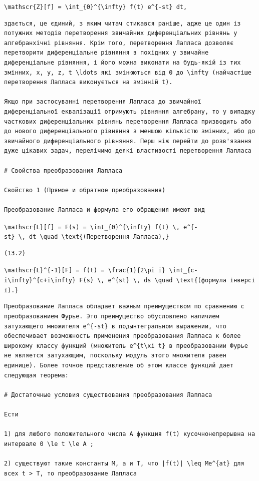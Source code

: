 \documentclass[
  ukrainian,
]{article}
\begin{document}
\texttt{\textbackslash{}mathscr\{Z\}{[}f{]}\ =\ \textbackslash{}int\_\{0\}\^{}\{\textbackslash{}infty\}\ f(t)\ e\^{}\{-st\}\ dt,}

\begin{verbatim}
здається, це єдиний, з яким читач стикався раніше, адже це один із потужних методів перетворення звичайних диференціальних рівнянь у алгебранхічні рівняння. Крім того, перетворення Лапласа дозволяє перетворити диференціальне рівняння в похідних у звичайне диференціальне рівняння, і його можна виконати на будь-якій із тих змінних, x, y, z, t \ldots які змінюються від 0 до \infty (найчастіше перетворення Лапласа виконується на змінній t).

Якщо при застосуванні перетворення Лапласа до звичайної диференціальної еквалізації отримують рівняння алгебрану, то у випадку часткових диференціальних рівнянь перетворення Лапласа призводить або до нового диференціального рівняння з меншою кількістю змінних, або до звичайного диференціального рівняння. Перш ніж перейти до розв'язання дуже цікавих задач, перелічимо деякі властивості перетворення Лапласа

# Свойства преобразования Лапласа

Свойство 1 (Прямое и обратное преобразования)

Преобразование Лапласа и формула его обращения имеют вид
\end{verbatim}

\texttt{\textbackslash{}mathscr\{L\}{[}f{]}\ =\ F(s)\ =\ \textbackslash{}int\_\{0\}\^{}\{\textbackslash{}infty\}\ f(t)\ \textbackslash{},\ e\^{}\{-st\}\ \textbackslash{},\ dt\ \textbackslash{}quad\ \textbackslash{}text\{(Перетворення\ Лапласа),\}}

\begin{verbatim}
(13.2)
\end{verbatim}

\texttt{\textbackslash{}mathscr\{L\}\^{}\{-1\}{[}F{]}\ =\ f(t)\ =\ \textbackslash{}frac\{1\}\{2\textbackslash{}pi\ i\}\ \textbackslash{}int\_\{c-i\textbackslash{}infty\}\^{}\{c+i\textbackslash{}infty\}\ F(s)\ \textbackslash{},\ e\^{}\{st\}\ \textbackslash{},\ ds\ \textbackslash{}quad\ \textbackslash{}text\{(формула\ інверсії).\}}

\begin{verbatim}
Преобразование Лапласа обладает важным преимуществом по сравнению с преобразованием Фурье. Это преимущество обусловлено наличием затухающего множителя e^{-st} в подынтегральном выражении, что обеспечивает возможность применения преобразования Лапласа к более широкому классу функций (множитель e^{t\xi t} в преобразовании Фурье не является затухающим, поскольку модуль этого множителя равен единице). Более точное представление об этом классе функций дает следующая теорема:

# Достаточные условия существования преобразования Лапласа

Ести

1) для любого положительного числа A функция f(t) кусочнонепрерывна на интервале 0 \le t \le A ;

2) существуют такие константы M, a и T, что |f(t)| \leq Me^{at} для всех t > T, то преобразование Лапласа
\end{verbatim}
\end{document}
